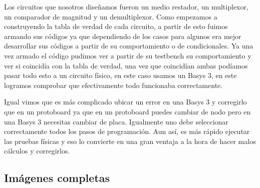 \documentclass[12pt]{article}  %
\begin{document}
Los circuitos que nosotros diseñamos fueron un medio restador, un multiplexor, un comparador de magnitud y un demultiplexor. Como empezamos a construyendo la tabla de verdad de cada circuito, a partir de esto fuimos armando sus códigos ya que dependiendo de los casos para algunos era mejor desarrollar sus códigos a partir de su comportamiento o de condicionales. Ya una vez armado el código pudimos ver a partir de su testbench su comportamiento y ver si coincidía con la tabla de verdad, una vez que coincidían ambas podíamos pasar todo esto a un circuito físico, en este caso usamos un Basys 3, en este logramos comprobar que efectivamente todo funcionaba correctamente. 

Igual vimos que es más complicado ubicar un error en una Basys 3 y corregirlo que en un protoboard ya que en un protoboard puedes cambiar de nodo pero en una Basys 3 necesitas cambiar de placa. Igualmente uno debe seleccionar correctamente todos los pasos de programación. Aun así, es más rápido ejecutar las pruebas físicas y eso lo convierte en una gran ventaja a la hora de hacer malos cálculos y corregirlos. 

\newpage %
\appendix %

\subsection*{Imágenes completas}
\end{document}
